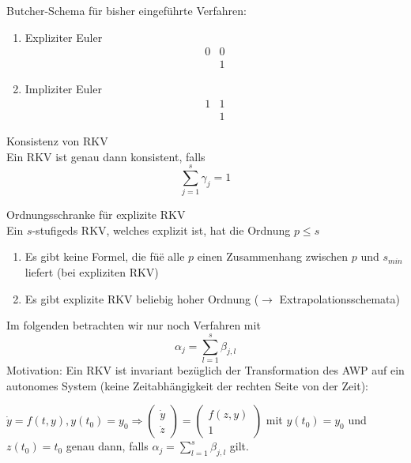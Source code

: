\begin{example}
	Butcher-Schema für bisher eingeführte Verfahren:
	
	\begin{enumerate}
		\item Expliziter Euler
				$$\begin{array}{cc}
			0 & 0\\
			  & 1
		\end{array}$$

		\item Impliziter Euler
				$$\begin{array}{cc}
			1 & 1\\
			  & 1
		\end{array}$$
		
	\end{enumerate}
\end{example}

\begin{theorem}
	Konsistenz von RKV
	\\
	Ein RKV ist genau dann konsistent, falls
	$$\sum_{j=1}^{s}\gamma_{j}=1$$
\end{theorem}

\begin{theorem}
	Ordnungsschranke für explizite RKV
	\\
	Ein $s$-stufigeds RKV, welches explizit ist, hat die Ordnung $p\le s$
\end{theorem}

\begin{remark}
	\begin{enumerate}
		\item Es gibt keine Formel, die füë alle $p$ einen Zusammenhang zwischen $p$ und $s_{min}$ liefert (bei expliziten RKV)
		\item Es gibt explizite RKV beliebig hoher Ordnung ($\rightarrow$ Extrapolationsschemata)
	\end{enumerate}
\end{remark}

Im folgenden betrachten wir nur noch Verfahren mit $$\alpha_{j}=\sum_{l=1}^{s}\beta_{j,l}$$
Motivation: Ein RKV ist invariant bezüglich der Transformation des AWP auf ein autonomes System (keine Zeitabhängigkeit der rechten
Seite von der Zeit):

$\dot y = f(t,y), y(t_{0})=y_{0}\Rightarrow \left ( \begin{array}{c}
\dot y\\
\dot z
\end{array} \right ) = \left (
\begin{array}
{c}
	f(z,y)\\
	1
\end{array} \right )$ mit $y(t_{0})=y_{0}$ und $z(t_{0})=t_{0}$
genau dann, falls $\alpha_{j}=\sum_{l=1}^{s}\beta_{j,l}$ gilt.

